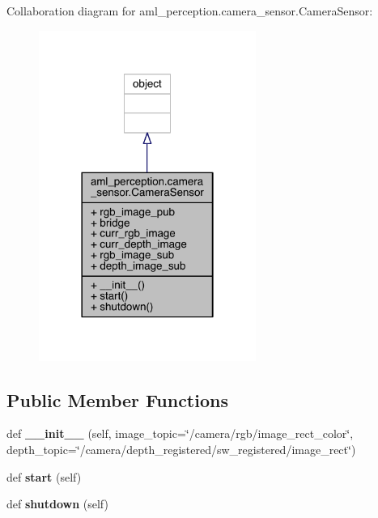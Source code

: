 Collaboration diagram for aml\+\_\+perception.\+camera\+\_\+sensor.\+Camera\+Sensor\+:
\nopagebreak
\begin{figure}[H]
\begin{center}
\leavevmode
\includegraphics[width=201pt]{classaml__perception_1_1camera__sensor_1_1_camera_sensor__coll__graph}
\end{center}
\end{figure}
\subsection*{Public Member Functions}
\begin{DoxyCompactItemize}
\item 
\hypertarget{classaml__perception_1_1camera__sensor_1_1_camera_sensor_a315c3e91762a38dbf8ecd07f30e099f1}{}\label{classaml__perception_1_1camera__sensor_1_1_camera_sensor_a315c3e91762a38dbf8ecd07f30e099f1} 
def {\bfseries \+\_\+\+\_\+init\+\_\+\+\_\+} (self, image\+\_\+topic=\char`\"{}/camera/rgb/image\+\_\+rect\+\_\+color\char`\"{}, depth\+\_\+topic=\char`\"{}/camera/depth\+\_\+registered/sw\+\_\+registered/image\+\_\+rect\char`\"{})
\item 
\hypertarget{classaml__perception_1_1camera__sensor_1_1_camera_sensor_a5967f87a0f03eb4dfbabd049921595b4}{}\label{classaml__perception_1_1camera__sensor_1_1_camera_sensor_a5967f87a0f03eb4dfbabd049921595b4} 
def {\bfseries start} (self)
\item 
\hypertarget{classaml__perception_1_1camera__sensor_1_1_camera_sensor_aec9d980f6d93b1df114ceebba4266dfc}{}\label{classaml__perception_1_1camera__sensor_1_1_camera_sensor_aec9d980f6d93b1df114ceebba4266dfc} 
def {\bfseries shutdown} (self)
\end{DoxyCompactItemize}
